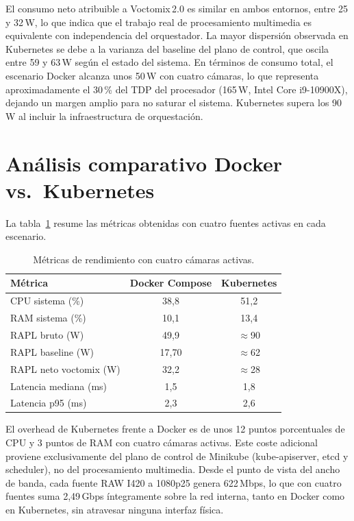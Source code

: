 El consumo neto atribuible a Voctomix\,2.0 es similar en ambos entornos, entre
25 y 32\,W, lo que indica que el trabajo real de procesamiento multimedia es
equivalente con independencia del orquestador. La mayor dispersión observada en
Kubernetes se debe a la varianza del baseline del plano de control, que oscila
entre 59 y 63\,W según el estado del sistema. En términos de consumo total, el escenario Docker alcanza unos 50\,W con cuatro
cámaras, lo que representa aproximadamente el 30\,\% del TDP del procesador
(165\,W, Intel Core i9-10900X), dejando un margen amplio para no saturar el
sistema. Kubernetes supera los 90\,W al incluir la infraestructura de
orquestación.

\section{Análisis comparativo Docker vs.\ Kubernetes}
\label{sec:rendimiento_escenarios}

La tabla~\ref{tab:rendimiento_docker} resume las métricas obtenidas con cuatro
fuentes activas en cada escenario.

\begin{table}[H]
  \centering
  \caption{Métricas de rendimiento con cuatro cámaras activas.}
  \label{tab:rendimiento_docker}
  \small
  \begin{tabular}{|l|c|c|}
    \hline
    \textbf{Métrica} & \textbf{Docker Compose} & \textbf{Kubernetes} \\
    \hline
    CPU sistema (\%)         & 38{,}8 & 51{,}2 \\
    RAM sistema (\%)         & 10{,}1 & 13{,}4 \\
    RAPL bruto (W)           & 49{,}9 & $\approx$90 \\
    RAPL baseline (W)        & 17{,}70 & $\approx$62 \\
    RAPL neto voctomix (W)   & 32{,}2 & $\approx$28 \\
    Latencia mediana (ms)    & 1{,}5 & 1{,}8 \\
    Latencia p95 (ms)        & 2{,}3 & 2{,}6 \\
    \hline
  \end{tabular}
\end{table}

El overhead de Kubernetes frente a Docker es de unos 12 puntos porcentuales de
CPU y 3 puntos de RAM con cuatro cámaras activas. Este coste adicional proviene
exclusivamente del plano de control de Minikube (kube-apiserver, etcd y
scheduler), no del procesamiento multimedia. Desde el punto de vista del ancho de
banda, cada fuente RAW I420 a 1080p25 genera 622\,Mbps, lo que con cuatro fuentes
suma 2{,}49\,Gbps íntegramente sobre la red interna, tanto en Docker como en
Kubernetes, sin atravesar ninguna interfaz física.

